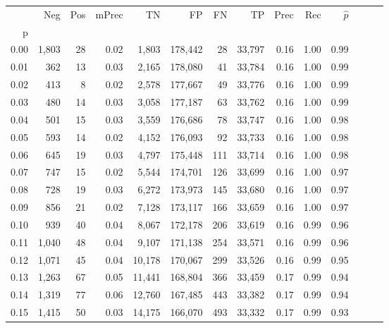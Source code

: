\begin{tabular}{rrrrrrrrrrrrrr}
\toprule
{} &    Neg &  Pos & mPrec &       TN &       FP &      FN &      TP &  Prec &   Rec & $\hat{p}$ \\
p    &        &      &       &          &          &         &         &       &       &           \\
\midrule
0.00 &  1,803 &   28 &  0.02 &    1,803 &  178,442 &      28 &  33,797 &  0.16 &  1.00 &      0.99 \\
0.01 &    362 &   13 &  0.03 &    2,165 &  178,080 &      41 &  33,784 &  0.16 &  1.00 &      0.99 \\
0.02 &    413 &    8 &  0.02 &    2,578 &  177,667 &      49 &  33,776 &  0.16 &  1.00 &      0.99 \\
0.03 &    480 &   14 &  0.03 &    3,058 &  177,187 &      63 &  33,762 &  0.16 &  1.00 &      0.99 \\
0.04 &    501 &   15 &  0.03 &    3,559 &  176,686 &      78 &  33,747 &  0.16 &  1.00 &      0.98 \\
0.05 &    593 &   14 &  0.02 &    4,152 &  176,093 &      92 &  33,733 &  0.16 &  1.00 &      0.98 \\
0.06 &    645 &   19 &  0.03 &    4,797 &  175,448 &     111 &  33,714 &  0.16 &  1.00 &      0.98 \\
0.07 &    747 &   15 &  0.02 &    5,544 &  174,701 &     126 &  33,699 &  0.16 &  1.00 &      0.97 \\
0.08 &    728 &   19 &  0.03 &    6,272 &  173,973 &     145 &  33,680 &  0.16 &  1.00 &      0.97 \\
0.09 &    856 &   21 &  0.02 &    7,128 &  173,117 &     166 &  33,659 &  0.16 &  1.00 &      0.97 \\
0.10 &    939 &   40 &  0.04 &    8,067 &  172,178 &     206 &  33,619 &  0.16 &  0.99 &      0.96 \\
0.11 &  1,040 &   48 &  0.04 &    9,107 &  171,138 &     254 &  33,571 &  0.16 &  0.99 &      0.96 \\
0.12 &  1,071 &   45 &  0.04 &   10,178 &  170,067 &     299 &  33,526 &  0.16 &  0.99 &      0.95 \\
0.13 &  1,263 &   67 &  0.05 &   11,441 &  168,804 &     366 &  33,459 &  0.17 &  0.99 &      0.94 \\
0.14 &  1,319 &   77 &  0.06 &   12,760 &  167,485 &     443 &  33,382 &  0.17 &  0.99 &      0.94 \\
0.15 &  1,415 &   50 &  0.03 &   14,175 &  166,070 &     493 &  33,332 &  0.17 &  0.99 &      0.93 \\

\end{tabular}
